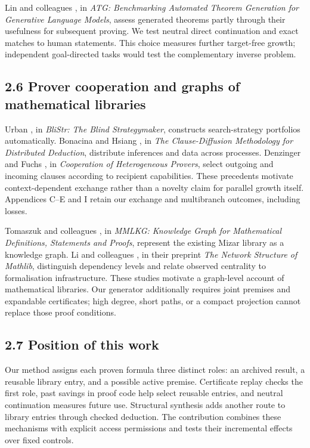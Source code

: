\documentclass[pdflatex,sn-basic,Numbered]{sn-jnl}
\begin{document}
Lin and colleagues \citep{LinEtAl2024}, in \emph{ATG: Benchmarking Automated Theorem Generation for Generative Language Models}, assess generated theorems partly through their usefulness for subsequent proving. We test neutral direct continuation and exact matches to human statements. This choice measures further target-free growth; independent goal-directed tasks would test the complementary inverse problem.

\subsection*{2.6 Prover cooperation and graphs of mathematical libraries}\label{prover-cooperation-and-graphs-of-mathematical-libraries}

Urban \citep{Urban2013BliStr}, in \emph{BliStr: The Blind Strategymaker}, constructs search-strategy portfolios automatically. Bonacina and Hsiang \citep{BonacinaHsiang1995}, in \emph{The Clause-Diffusion Methodology for Distributed Deduction}, distribute inferences and data across processes. Denzinger and Fuchs \citep{DenzingerFuchs1999}, in \emph{Cooperation of Heterogeneous Provers}, select outgoing and incoming clauses according to recipient capabilities. These precedents motivate context-dependent exchange rather than a novelty claim for parallel growth itself. Appendices C--E and I retain our exchange and multibranch outcomes, including losses.

Tomaszuk and colleagues \citep{TomaszukEtAl2023}, in \emph{MMLKG: Knowledge Graph for Mathematical Definitions, Statements and Proofs}, represent the existing Mizar library as a knowledge graph. Li and colleagues \citep{LiEtAl2026}, in their preprint \emph{The Network Structure of Mathlib}, distinguish dependency levels and relate observed centrality to formalisation infrastructure. These studies motivate a graph-level account of mathematical libraries. Our generator additionally requires joint premises and expandable certificates; high degree, short paths, or a compact projection cannot replace those proof conditions.

\subsection*{2.7 Position of this work}\label{position-of-this-work}

Our method assigns each proven formula three distinct roles: an archived result, a reusable library entry, and a possible active premise. Certificate replay checks the first role, past savings in proof code help select reusable entries, and neutral continuation measures future use. Structural synthesis adds another route to library entries through checked deduction. The contribution combines these mechanisms with explicit access permissions and tests their incremental effects over fixed controls.
\end{document}
